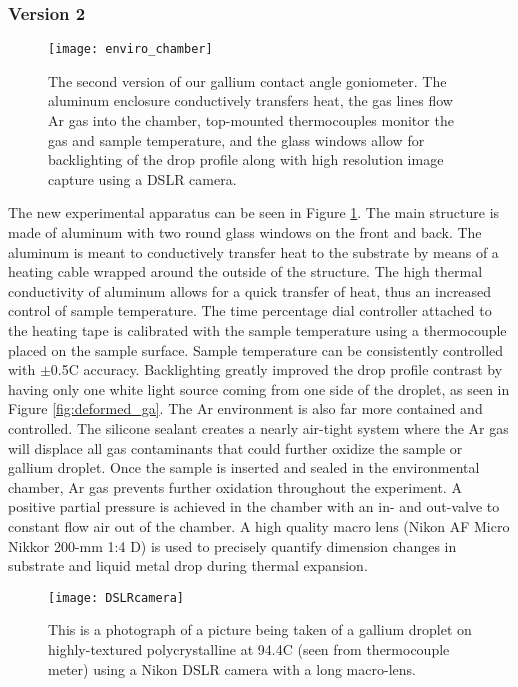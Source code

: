 \subsubsection{Version 2}
\begin{figure}
	\centering
	\texttt{[image: enviro\_chamber]}
	\caption{The second version of our gallium contact angle goniometer. The aluminum enclosure conductively transfers heat, the gas lines flow Ar gas into the chamber, top-mounted thermocouples monitor the gas and sample temperature, and the glass windows allow for backlighting of the drop profile along with high resolution image capture using a DSLR camera.}
	\label{fig:enviro_chamber}
\end{figure}
The new experimental apparatus can be seen in Figure \ref{fig:enviro_chamber}. The main structure is made of aluminum with two round glass windows on the front and back. The aluminum is meant to conductively transfer heat to the substrate by means of a heating cable wrapped around the outside of the structure. The high thermal conductivity of aluminum allows for a quick transfer of heat, thus an increased control of sample temperature. The time percentage dial controller attached to the heating tape is calibrated with the sample temperature using a thermocouple placed on the sample surface. Sample temperature can be consistently controlled with $\pm$0.5\degree C accuracy. Backlighting greatly improved the drop profile contrast by having only one white light source coming from one side of the droplet, as seen in Figure \ref{fig:deformed_ga}. The Ar environment is also far more contained and controlled. The silicone sealant creates a nearly air-tight system where the Ar gas will displace all gas contaminants that could further oxidize the sample or gallium droplet. 
Once the sample is inserted and sealed in the environmental chamber, Ar gas prevents further oxidation throughout the experiment. A positive partial pressure is achieved in the chamber with an in- and out-valve to constant flow air out of the chamber.  
A high quality macro lens (Nikon AF Micro Nikkor 200-mm 1:4 D) is used to precisely quantify dimension changes in substrate and liquid metal drop during thermal expansion. 
\begin{figure}
	\centering
	\texttt{[image: DSLRcamera]}
	\caption{This is a photograph of a picture being taken of a gallium droplet on highly-textured polycrystalline at 94.4\degree C (seen from thermocouple meter) using a Nikon DSLR camera with a long macro-lens. }
	\label{fig:DSLRcamera}
\end{figure}

